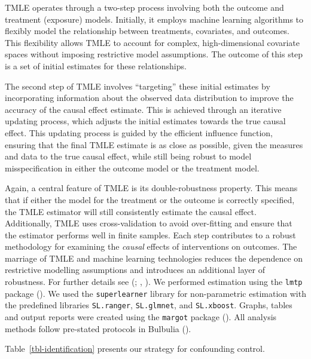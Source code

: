 \documentclass[
  singlecolumn]{article}
\begin{document}
TMLE operates through a two-step process involving both the outcome and
treatment (exposure) models. Initially, it employs machine learning
algorithms to flexibly model the relationship between treatments,
covariates, and outcomes. This flexibility allows TMLE to account for
complex, high-dimensional covariate spaces without imposing restrictive
model assumptions. The outcome of this step is a set of initial
estimates for these relationships.

The second step of TMLE involves ``targeting'' these initial estimates
by incorporating information about the observed data distribution to
improve the accuracy of the causal effect estimate. This is achieved
through an iterative updating process, which adjusts the initial
estimates towards the true causal effect. This updating process is
guided by the efficient influence function, ensuring that the final TMLE
estimate is as close as possible, given the measures and data to the
true causal effect, while still being robust to model misspecification
in either the outcome model or the treatment model.

Again, a central feature of TMLE is its double-robustness property. This
means that if either the model for the treatment or the outcome is
correctly specified, the TMLE estimator will still consistently estimate
the causal effect. Additionally, TMLE uses cross-validation to avoid
over-fitting and ensure that the estimator performs well in finite
samples. Each step contributes to a robust methodology for examining the
\emph{causal} effects of interventions on outcomes. The marriage of TMLE
and machine learning technologies reduces the dependence on restrictive
modelling assumptions and introduces an additional layer of robustness.
For further details see (; ,
). We performed estimation using the
\texttt{lmtp} package (). We used the \texttt{superlearner} library for non-parametric
estimation with the predefined libraries \texttt{SL.ranger},
\texttt{SL.glmnet}, and \texttt{SL.xboost}. Graphs, tables and output
reports were created using the \texttt{margot} package
(). All analysis methods follow
pre-stated protocols in Bulbulia
().

\newpage{}

Table~\ref{tbl-identification} presents our strategy for confounding
control.
\end{document}
